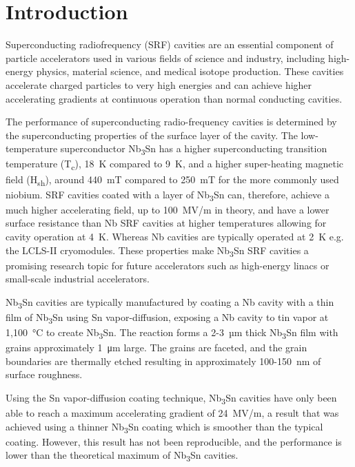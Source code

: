 \section{Introduction}%
\label{sec:Introduction}%
Superconducting radiofrequency (SRF) cavities are an essential component of particle accelerators used in various fields of science and industry, including high-energy physics, material science, and medical isotope production\cite{boulware2019high}. These cavities accelerate charged particles to very high energies and can achieve higher accelerating gradients at continuous operation than normal conducting cavities.

The performance of superconducting radio-frequency cavities is determined by the superconducting properties of the surface layer of the cavity. The low-temperature superconductor Nb\textsubscript{3}Sn has a higher superconducting transition temperature (T\textsubscript{c}), 18~K compared to 9~K, and a higher super-heating magnetic field (H\textsubscript{sh}), around 440~mT compared to 250~mT for the more commonly used niobium\cite{liarte2017theoretical, catelani2008temperature, lin2012effect, kubo2020superfluid}. SRF cavities coated with a layer of Nb\textsubscript{3}Sn can, therefore, achieve a much higher accelerating field, up to 100~MV/m in theory, and have a lower surface resistance than Nb SRF cavities at higher temperatures allowing for cavity operation at 4~K. Whereas Nb cavities are typically operated at 2~K e.g. the LCLS-II cryomodules\cite{galayda2018lcls}. These properties make Nb\textsubscript{3}Sn SRF cavities a promising research topic for future accelerators such as high-energy linacs or small-scale industrial accelerators.

Nb\textsubscript{3}Sn cavities are typically manufactured by coating a Nb cavity with a thin film of Nb\textsubscript{3}Sn using Sn vapor-diffusion\cite{posen2017nb3sn, pudasaini2019growth, porter2018update}, exposing a Nb cavity to tin vapor at 1,100~°C to create Nb\textsubscript{3}Sn. The reaction forms a 2-3~µm thick Nb\textsubscript{3}Sn film with grains approximately 1~\unit{\micro\metre} large. The grains are faceted, and the grain boundaries are thermally etched resulting in approximately 100-150~nm of surface roughness. 

Using the Sn vapor-diffusion coating technique\cite{posen2017nb3sn,pudasaini2019growth,eremeev2013development}, Nb\textsubscript{3}Sn cavities have only been able to reach a maximum accelerating gradient of 24~MV/m\cite{posen2021advances}, a result that was achieved using a thinner Nb\textsubscript{3}Sn coating which is smoother than the typical coating. However, this result has not been reproducible, and the performance is lower than the theoretical maximum of Nb\textsubscript{3}Sn cavities.

